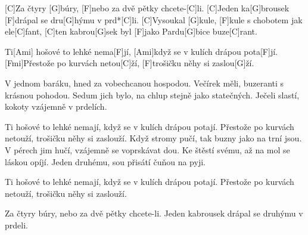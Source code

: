 
[C]Za čtyry [G]búry, [F]nebo za dvě pětky chcete-[C]li.
[C]Jeden ka[G]brousek [F]drápal se dru[G]hýmu v prd*[C]li.
[C]Vysoukal [G]kule, [F]kule s chobotem jak ele[C]fant,
[C]ten kabrou[G]sek byl [F]jako Pardu[G]bice buze[C]rant.

Ti[Ami] hošové to lehké nema[F]jí,
[Ami]když se v kulích drápou pota[F]jí.
[Fmi]Přestože po kurvách netou[C]\null ží,
[F]trošičku něhy si zaslou[G]\null ží.

\begin{multicols}{2}
V jednom baráku, hned za vobechcanou hospodou.
Večírek měli, buzeranti s krásnou pohodou.
Sedum jich bylo, na chlup stejně jako statečných.
Ječeli slastí, kokoty vzájemně v prdelích.

Ti hošové to lehké nemají,
když se v kulích drápou potají.
Přestože po kurvách netouží,
trošičku něhy si zaslouží.
\vfill\null
\columnbreak
Když stromy pučí, tak buzny jako na trní jsou.
V pérech jim hučí, vzájemně se voprskávat dou.
Ke štěstí svému, až na mol se láskou opíjí.
Jeden druhému, sou přisátí čuňou na pyji.

Ti hošové to lehké nemají,
když se v kulích drápou potají.
Přestože po kurvách netouží,
trošičku něhy si zaslouží.

Za čtyry búry, nebo za dvě pětky chcete-li.
Jeden kabrousek drápal se druhýmu v prdeli.
\end{multicols}